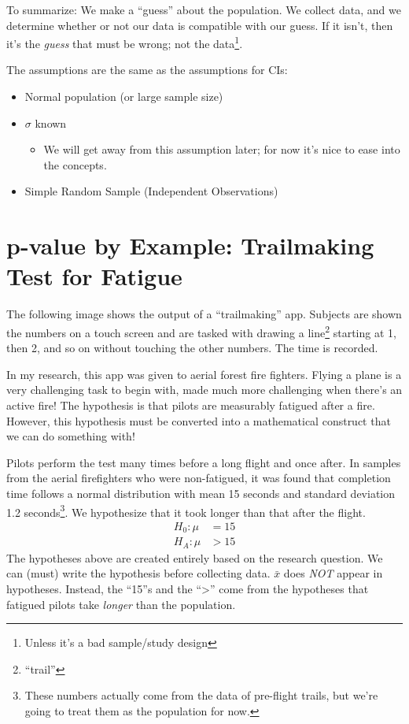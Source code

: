 \documentclass[
  letterpaper,
  DIV=11,
  numbers=noendperiod]{scrreprt}
\providecommand{\tightlist}{%
  \setlength{\itemsep}{0pt}\setlength{\parskip}{0pt}}\usepackage{longtable,booktabs,array}
\begin{document}
To summarize: We make a ``guess'' about the population. We collect data,
and we determine whether or not our data is compatible with our guess.
If it isn't, then it's the \emph{guess} that must be wrong; not the
data\footnote{Unless it's a bad sample/study design}.

The assumptions are the same as the assumptions for CIs:

\begin{itemize}
\tightlist
\item
  Normal population (or large sample size)
\item
  \(\sigma\) known

  \begin{itemize}
  \tightlist
  \item
    We will get away from this assumption later; for now it's nice to
    ease into the concepts.
  \end{itemize}
\item
  Simple Random Sample (Independent Observations)
\end{itemize}

\hypertarget{p-value-by-example-trailmaking-test-for-fatigue}{%
\section{p-value by Example: Trailmaking Test for
Fatigue}\label{p-value-by-example-trailmaking-test-for-fatigue}}

The following image shows the output of a ``trailmaking'' app. Subjects
are shown the numbers on a touch screen and are tasked with drawing a
line\footnote{``trail''} starting at 1, then 2, and so on without
touching the other numbers. The time is recorded.

In my research, this app was given to aerial forest fire fighters.
Flying a plane is a very challenging task to begin with, made much more
challenging when there's an active fire! The hypothesis is that pilots
are measurably fatigued after a fire. However, this hypothesis must be
converted into a mathematical construct that we can do something with!

Pilots perform the test many times before a long flight and once after.
In samples from the aerial firefighters who were non-fatigued, it was
found that completion time follows a normal distribution with mean 15
seconds and standard deviation 1.2 seconds\footnote{These numbers
  actually come from the data of pre-flight trails, but we're going to
  treat them as the population for now.}. We hypothesize that it took
longer than that after the flight. \begin{align*}
H_0: \mu &= 15\\
H_A: \mu &> 15
\end{align*} The hypotheses above are created entirely based on the
research question. We can (must) write the hypothesis before collecting
data. \(\bar x\) does \emph{NOT} appear in hypotheses. Instead, the
``15''s and the ``\textgreater{}'' come from the hypotheses that
fatigued pilots take \emph{longer} than the population.
\end{document}
